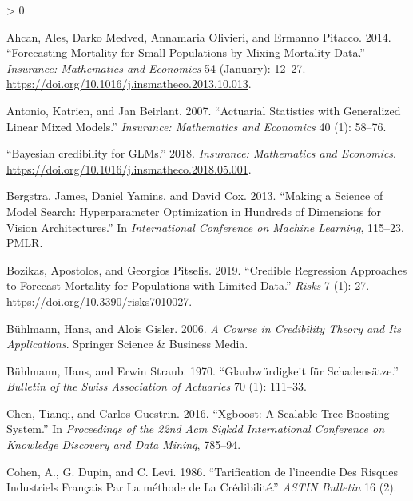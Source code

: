 \documentclass[
]{article}
\newlength{\cslhangindent}
\newenvironment{CSLReferences}[2] %
 {%
  \setlength{\parindent}{0pt}
  \ifodd #1 \everypar{\setlength{\hangindent}{\cslhangindent}}\ignorespaces\fi
  \ifnum #2 > 0
  \setlength{\parskip}{#2\baselineskip}
  \fi
 }%
 {}
\begin{document}
\hypertarget{refs}{}
\begin{CSLReferences}{1}{0}
\leavevmode\hypertarget{ref-ahcanforecasting2014}{}%
Ahcan, Ales, Darko Medved, Annamaria Olivieri, and Ermanno Pitacco.
2014. {``Forecasting Mortality for Small Populations by Mixing Mortality
Data.''} \emph{Insurance: Mathematics and Economics} 54 (January):
12--27. \url{https://doi.org/10.1016/j.insmatheco.2013.10.013}.

\leavevmode\hypertarget{ref-antonio2007actuarial}{}%
Antonio, Katrien, and Jan Beirlant. 2007. {``Actuarial Statistics with
Generalized Linear Mixed Models.''} \emph{Insurance: Mathematics and
Economics} 40 (1): 58--76.

\leavevmode\hypertarget{ref-Xacur2018}{}%
{``{Bayesian credibility for GLMs}.''} 2018. \emph{Insurance:
Mathematics and Economics}.
\url{https://doi.org/10.1016/j.insmatheco.2018.05.001}.

\leavevmode\hypertarget{ref-bergstra2013making}{}%
Bergstra, James, Daniel Yamins, and David Cox. 2013. {``Making a Science
of Model Search: Hyperparameter Optimization in Hundreds of Dimensions
for Vision Architectures.''} In \emph{International Conference on
Machine Learning}, 115--23. PMLR.

\leavevmode\hypertarget{ref-bozikascredible2019}{}%
Bozikas, Apostolos, and Georgios Pitselis. 2019. {``Credible
{Regression} {Approaches} to {Forecast} {Mortality} for {Populations}
with {Limited} {Data}.''} \emph{Risks} 7 (1): 27.
\url{https://doi.org/10.3390/risks7010027}.

\leavevmode\hypertarget{ref-buhlmann2006course}{}%
Bühlmann, Hans, and Alois Gisler. 2006. \emph{A Course in Credibility
Theory and Its Applications}. Springer Science \& Business Media.

\leavevmode\hypertarget{ref-buhlmann1970glaubwurdigkeit}{}%
Bühlmann, Hans, and Erwin Straub. 1970. {``Glaubw{ü}rdigkeit f{ü}r
Schadens{ä}tze.''} \emph{Bulletin of the Swiss Association of Actuaries}
70 (1): 111--33.

\leavevmode\hypertarget{ref-chen2016xgboost}{}%
Chen, Tianqi, and Carlos Guestrin. 2016. {``Xgboost: A Scalable Tree
Boosting System.''} In \emph{Proceedings of the 22nd Acm Sigkdd
International Conference on Knowledge Discovery and Data Mining},
785--94.

\leavevmode\hypertarget{ref-cohendupinlevi86}{}%
Cohen, A., G. Dupin, and C. Levi. 1986. {``Tarification de l'incendie
Des Risques Industriels Français Par La m{é}thode de La
Cr{é}dibilit{é}.''} \emph{ASTIN Bulletin} 16 (2).


\end{CSLReferences}
\end{document}
